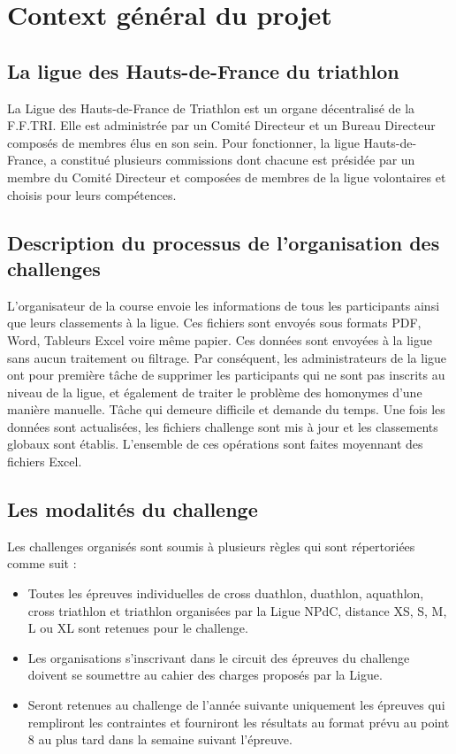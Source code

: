 \documentclass[12pt,a4paper]{report}
\begin{document}
	\newpage
	\section {Context général du projet}
	\subsection{La ligue des Hauts-de-France du triathlon }
	
	La Ligue des Hauts-de-France de Triathlon est un organe décentralisé de la F.F.TRI. Elle est administrée par un Comité Directeur et un Bureau Directeur composés de membres élus en son sein. 
	Pour fonctionner, la ligue Hauts-de-France, a constitué plusieurs commissions dont chacune est présidée par un membre du Comité Directeur et composées de membres de la ligue volontaires et choisis pour leurs compétences.
	
	\subsection{Description du processus de l’organisation des challenges }
	L’organisateur de la course envoie les informations de tous les participants ainsi que leurs classements à la ligue. Ces fichiers sont envoyés sous formats PDF, Word, Tableurs Excel voire même papier.  Ces données sont envoyées à la ligue sans aucun traitement ou filtrage. Par conséquent, les administrateurs de la ligue ont pour première tâche de supprimer les participants qui ne sont pas inscrits au niveau de la ligue, et également de traiter le problème des homonymes d’une manière manuelle. Tâche qui demeure difficile et demande du temps.
	Une fois les données sont actualisées, les fichiers challenge sont mis à jour et les classements globaux sont établis. L’ensemble de ces opérations sont faites moyennant des fichiers Excel.
	
	
	\subsection{Les modalités du challenge  }
	Les challenges organisés sont soumis à plusieurs règles qui sont répertoriées comme suit :
	\begin{itemize} 
	\item 	Toutes les épreuves individuelles de cross duathlon, duathlon, aquathlon, cross triathlon et triathlon organisées par la Ligue NPdC, distance XS, S, M, L ou XL sont retenues pour le challenge.
	\item 	Les organisations s'inscrivant dans le circuit des épreuves du challenge doivent se soumettre au cahier des charges proposés par la Ligue.
	 \item  Seront retenues au challenge de l’année suivante uniquement les épreuves qui rempliront les contraintes et fourniront les résultats au format prévu au point 8 au plus tard dans la semaine suivant l’épreuve.
	
	\end{itemize} 
\end{document}
